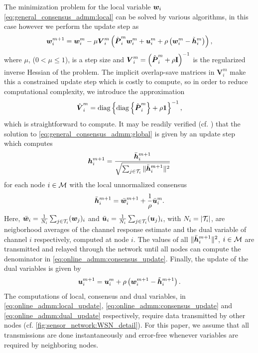 \documentclass{article}
\begin{document}
The minimization problem for the local variable \({\bm{w}}_i\) \eqref{eq:general_consensus_admm:local} can be solved by various algorithms, in this case however we perform the update step as
\begin{equation}
    {\bm{w}}_i^{m+1} = {\bm{w}}_i^{m} - \mu \bm{{V}}_i^m \left( \hat{{\bm{{P}}}}_i^m {\bm{w}}_i^m + {\bm{u}}_i^m + \rho\left({\bm{w}}_i^m - \tilde{{\bm{h}}}_i^{m}\right)\right),\label{eq:online_admm:local_update}
\end{equation}
where \(\mu\), (\(0  < \mu\leq 1\)), is a step size and \(\bm{{V}}_i^m = \left(\hat{{\bm{{P}}}}_i^m + \rho \bm{\mathrm{I}} \right)^{-1}\) is the regularized inverse Hessian of the problem.
The implicit overlap-save matrices in \(\bm{{V}}_i^m\) make this a constrained update step which is costly to compute, so in order to reduce computational complexity, we introduce the approximation
\begin{equation}
    \hat{\bm{{V}}}_i^m = \operatorname{diag} \left\{ \operatorname{diag} \left\{ \hat{{\bm{{P}}}}_i^m \right\} + \rho \bm{\mathrm{1}} \right\}^{-1},
\end{equation}
which is straightforward to compute.
It may be readily verified (cf. \cite{boydDistributedOptimizationStatistical2011}) that the solution to \eqref{eq:general_consensus_admm:global} is given by an update step which computes
\begin{equation}
    {\bm{h}}_i^{m+1} = \frac{\bar{{\bm{h}}}_i^{m+1}}{\sqrt{\sum_{j \in \mathcal{T}_i} \|\bar{{\bm{h}}}_i^{m+1}\|^2}}\label{eq:online_admm:consensus_update}
\end{equation}
for each node \(i \in \mathcal{M}\) with the local unnormalized consensus
\begin{equation}
    \bar{{\bm{h}}}_i^{m+1} = \bar{{\bm{w}}}_i^{m+1} + \frac{1}{\rho} \bar{{\bm{u}}}_i^{m}.
\end{equation}
Here, \(\bar{{\bm{w}}}_i = \frac{1}{N_i} \sum_{j \in \mathcal{T}_i} ({\bm{w}}_j)_i\) and \(\bar{{\bm{u}}}_i = \frac{1}{N_i} \sum_{j \in \mathcal{T}_i} ({\bm{u}}_j)_i\), with \(N_i = | \mathcal{T}_i |\), are neigborhood averages of the channel response estimate and the dual variable of channel \(i\) respectively, computed at node \(i\). The values of all \(\|\bar{{\bm{h}}}_i^{m+1}\|^2\), \(i \in \mathcal{M}\) are transmitted and relayed through the network until all nodes can compute the denominator in \eqref{eq:online_admm:consensus_update}.
Finally, the update of the dual variables is given by
\begin{equation}
    {\bm{u}}_i^{m+1} = {\bm{u}}_i^{m} + \rho \left( {\bm{w}}_i^{m+1} - \tilde{{\bm{h}}}_i^{m+1} \right).\label{eq:online_admm:dual_update}
\end{equation}
The computations of local, consensus and dual variables, in \eqref{eq:online_admm:local_update}, \eqref{eq:online_admm:consensus_update} and \eqref{eq:online_admm:dual_update} respectively, require data transmitted by other nodes (cf. \autoref{fig:sensor_network:WSN_detail}). For this paper, we assume that all transmissions are done instantaneously and error-free whenever variables are required by neighboring nodes.
\end{document}

